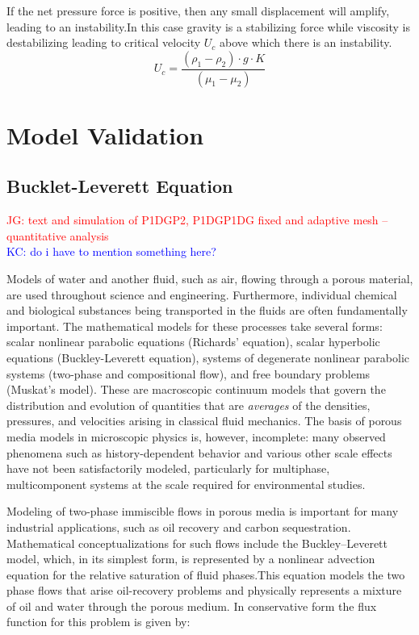 \documentclass[preprint,authoryear,12pt]{elsarticle}
\begin{document}
If the net pressure force is positive, then any small displacement will amplify, leading to an instability.In this case gravity is a stabilizing force while viscosity is destabilizing leading to critical velocity $U_c$ above which there is an instability.\\

\begin{equation}
U_c = \frac{(\rho_1-\rho_2) \cdot g \cdot K}{(\mu_1-\mu_2)}
\end{equation}

\section{Model Validation}\label{section:ModelValidation}
 
\subsection{Bucklet-Leverett Equation}\label{section:BuckletLeverettEquation}
\textcolor{red}{JG: text and simulation of P1DGP2, P1DGP1DG fixed and adaptive mesh -- quantitative analysis}\\
\textcolor{blue}{KC: do i have to mention something here?\\}

Models of water and another fluid, such as air, flowing through a
porous material, are used throughout science and
engineering.  Furthermore, individual chemical and biological
substances being transported in the fluids are often fundamentally
important. The mathematical models for these processes take several forms: scalar nonlinear parabolic equations (Richards' equation), scalar hyperbolic equations (Buckley-Leverett equation), systems of degenerate nonlinear parabolic systems (two-phase and compositional flow), and free boundary problems (Muskat's model). These are macroscopic continuum models that govern the distribution and evolution of quantities that are {\em averages} of the densities, pressures, and velocities arising in classical fluid mechanics. The basis of porous media models in microscopic physics is, however, incomplete: many observed phenomena such as history-dependent behavior and various other scale effects have not been satisfactorily modeled, particularly for multiphase,
multicomponent systems at the scale required for environmental
studies.

Modeling of two-phase immiscible flows in porous media is
important for many industrial applications, such as oil recovery and carbon sequestration. Mathematical conceptualizations for such flows include the Buckley–Leverett model, which, in its simplest form, is represented by a nonlinear advection equation for the relative saturation of fluid phases.This equation models the two phase flows that arise oil-recovery problems and physically
represents a mixture of oil and water through the porous medium.
In conservative form the flux function for this
problem is given by:
\end{document}
